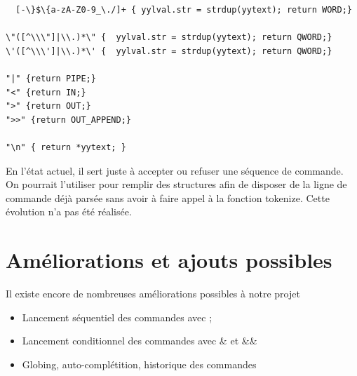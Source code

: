 \documentclass[fr]{article}
\begin{document}
\begin{lstlisting}
  [-\}$\{a-zA-Z0-9_\./]+ { yylval.str = strdup(yytext); return WORD;}

\"([^\\\"]|\\.)*\" {  yylval.str = strdup(yytext); return QWORD;}
\'([^\\\']|\\.)*\' {  yylval.str = strdup(yytext); return QWORD;}

"|" {return PIPE;}
"<" {return IN;}
">" {return OUT;}
">>" {return OUT_APPEND;}

"\n" { return *yytext; } 
\end{lstlisting}
En l'état actuel, il sert juste à accepter ou refuser une séquence de
commande. On pourrait l'utiliser pour remplir des structures afin de 
disposer de la ligne de commande déjà parsée sans avoir à faire appel
à la fonction tokenize. Cette évolution n'a pas été réalisée.
\section{Améliorations et ajouts possibles}
Il existe encore de nombreuses améliorations possibles à notre projet
\begin{itemize}
  \item Lancement séquentiel des commandes avec ;
  \item Lancement conditionnel des commandes avec \& et \&\&
  \item Globing, auto-complétition, historique des commandes
\end{itemize}
\end{document}
